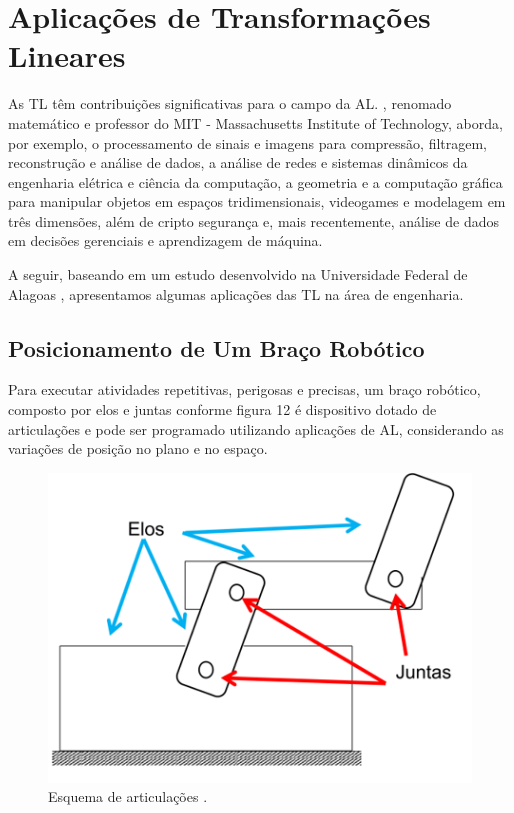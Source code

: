 \chapter{Aplicações de Transformações Lineares}
As TL têm contribuições significativas para o campo da AL. \cite{strang2010}, renomado matemático e professor do MIT - Massachusetts Institute of Technology, aborda, por exemplo, o processamento de sinais e imagens para compressão, filtragem, reconstrução e análise de dados, a análise de redes e sistemas dinâmicos da engenharia elétrica e ciência da computação, a geometria e a computação gráfica para manipular objetos em espaços tridimensionais, videogames e modelagem em três dimensões, além de cripto segurança e, mais recentemente, análise de dados em decisões gerenciais e aprendizagem de máquina. \nocite{pitombeira1971}

A seguir, baseando em um estudo desenvolvido na Universidade Federal de Alagoas \cite{sirlandro2017}, apresentamos algumas aplicações das TL na área de engenharia.

\section{Posicionamento de Um Braço Robótico}
Para executar atividades repetitivas, perigosas e precisas, um braço robótico, composto por elos e juntas conforme figura 12 é dispositivo dotado de articulações e pode ser programado utilizando aplicações de AL, considerando as variações de posição no plano e no espaço.

\begin{figure}[H]
	\centering
	\includegraphics[scale=1.00]{a_robo1.png}
	\caption{Esquema de articulações \cite{sirlandro2017}.}
\end{figure} 

